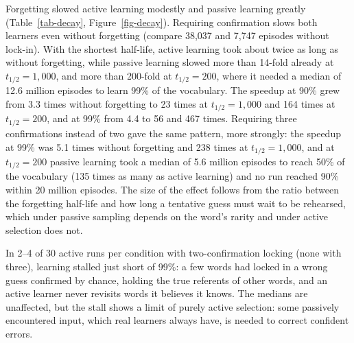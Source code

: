 \documentclass[a4paper,natbib,man]{apa6}
\begin{document}
Forgetting slowed active learning modestly and passive learning greatly (Table~\ref{tab-decay}, Figure~\ref{fig-decay}). Requiring confirmation slows both learners even without forgetting (compare 38,037 and 7,747 episodes without lock-in). With the shortest half-life, active learning took about twice as long as without forgetting, while passive learning slowed more than 14-fold already at $t_{1/2}=1{,}000$, and more than 200-fold at $t_{1/2}=200$, where it needed a median of 12.6 million episodes to learn 99\% of the vocabulary. The speedup at 90\% grew from 3.3 times without forgetting to 23 times at $t_{1/2}=1{,}000$ and 164 times at $t_{1/2}=200$, and at 99\% from 4.4 to 56 and 467 times. Requiring three confirmations instead of two gave the same pattern, more strongly: the speedup at 99\% was 5.1 times without forgetting and 238 times at $t_{1/2}=1{,}000$, and at $t_{1/2}=200$ passive learning took a median of 5.6 million episodes to reach 50\% of the vocabulary (135 times as many as active learning) and no run reached 90\% within 20 million episodes. The size of the effect follows from the ratio between the forgetting half-life and how long a tentative guess must wait to be rehearsed, which under passive sampling depends on the word's rarity and under active selection does not.

In 2--4 of 30 active runs per condition with two-confirmation locking (none with three), learning stalled just short of 99\%: a few words had locked in a wrong guess confirmed by chance, holding the true referents of other words, and an active learner never revisits words it believes it knows. The medians are unaffected, but the stall shows a limit of purely active selection: some passively encountered input, which real learners always have, is needed to correct confident errors.
\end{document}
